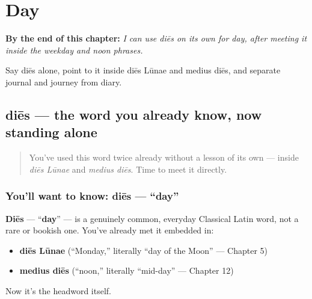 
\chapter{Day}
\label{ch:la-day}

\begin{chapteropening}
\textbf{By the end of this chapter:} \emph{I can use diēs on its own for day, after meeting it inside the weekday and noon phrases.}

Say diēs alone, point to it inside diēs Lūnae and medius diēs, and separate journal and journey from diary.
\end{chapteropening}

\section[diēs]{diēs — the word you already know, now standing alone}

\label{lesson:LA-C28-dies}



\begin{quote}
You've used this word twice already without a lesson of its own — inside \emph{diēs Lūnae} and \emph{medius diēs}. Time to meet it directly.
\end{quote}

\subsection*{You'll want to know: diēs — \textquotedblleft{}day\textquotedblright{}}
\textbf{Diēs} — \textquotedblleft{}\textbf{day}\textquotedblright{} — is a genuinely common, everyday Classical Latin word, not a rare or bookish one. You've already met it embedded in:

\begin{itemize}
\raggedright
  \item \textbf{diēs Lūnae} (\textquotedblleft{}Monday,\textquotedblright{} literally \textquotedblleft{}day of the Moon\textquotedblright{} — Chapter 5)
  \item \textbf{medius diēs} (\textquotedblleft{}noon,\textquotedblright{} literally \textquotedblleft{}mid-day\textquotedblright{} — Chapter 12)
\end{itemize}

Now it's the headword itself.

